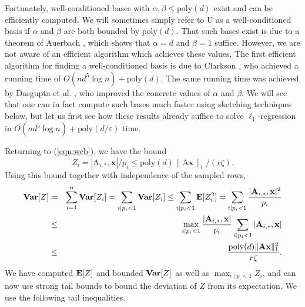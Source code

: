 \documentclass[11pt]{article}
\newcommand{\mat}[1]{{\ensuremath{\bm{\mathrm{#1}}}}}
\def\matA{\mat{A}}
\def\matU{\mat{U}}
\def\frac#1#2{{#1\over #2}}
\def\x{{\mathbf x}}
\newcommand{\eps}{\varepsilon}
\newcommand{\poly}{{\mathrm{poly}}}
\begin{document}
Fortunately, well-conditioned bases with $\alpha, \beta \leq \poly(d)$ exist and can be efficiently computed. We
will sometimes simply refer to $\matU$ as a well-conditioned basis if $\alpha$ and $\beta$ are both bounded by $\poly(d)$.
That such bases exist is due to a theorem of Auerbach \cite{a30,ak08}, 
which shows that $\alpha = d$ and $\beta = 1$ suffice. 
However,
we are not aware of an efficient algorithm which achieves these values. The
first efficient algorithm for finding a well-conditioned basis is due to Clarkson \cite{Cla05}, 
who achieved a running time of $O(nd^5 \log n) + \poly(d)$. 
The same running time was achieved by 
Dasgupta et al. \cite{DDHKM09}, who improved the concrete values of $\alpha$ and $\beta$. 
We will see that one can in fact compute such bases much faster using sketching techniques below, but let us first
see how these results already suffice to solve $\ell_1$-regression in $O(nd^5 \log n) + \poly(d/\eps)$ time. 

Returning to (\ref{eqn:wcb}), we have the bound
$$Z_i = |\matA_{i,*}, \x|/p_i \leq \poly(d) \|\matA \x\|_1/(r \zeta).$$
Using this bound together with independence of the sampled rows, 
\begin{eqnarray*}
{\bf Var}[Z] & = & \sum_{i=1}^n {\bf Var}[Z_i] = \sum_{i \mid p_i < 1} {\bf Var}[Z_i] \leq \sum_{i \mid p_i < 1} {\bf E}[Z_i^2]
= \sum_{i \mid p_i < 1} \frac{|\matA_{i,*}, \x|^2}{p_i}\\
& \leq & \max_{i \mid p_i < 1} \frac{|\matA_{i,*}, \x|}{p_i} \sum_{i \mid p_i < 1} |\matA_{i,*}, \x|\\
& \leq & \frac{\poly(d) \|\matA \x\|_1^2}{r \zeta}.
\end{eqnarray*}
We have computed ${\bf E}[Z]$ and bounded ${\bf Var}[Z]$ as well as $\max_{i \mid p_i < 1} Z_i$, 
and can now use strong tail bounds to bound the deviation of
$Z$ from its expectation. We use the following tail inequalities.
\end{document}
